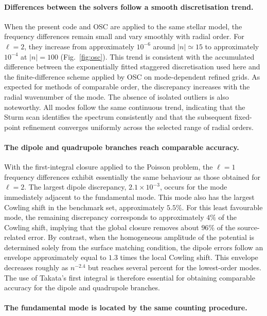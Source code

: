 \documentclass[]{aa}
\begin{document}
\paragraph{Differences between the solvers follow a smooth discretisation
trend.}When the present code and OSC are applied to the same stellar model, the
frequency differences remain small and vary smoothly with radial order. For
$\ell=2$, they increase from approximately $10^{-6}$ around
$|n|\simeq15$ to approximately $10^{-4}$ at $|n|=100$
(Fig.~\ref{fig:osc}). This trend is consistent with the accumulated
difference between the exponentially fitted staggered discretisation used
here and the finite-difference scheme applied by OSC on mode-dependent
refined grids. As expected for methods of comparable order, the discrepancy
increases with the radial wavenumber of the mode. The absence of isolated outliers is also noteworthy. All modes follow the
same continuous trend, indicating that the Sturm scan identifies the
spectrum consistently and that the subsequent fixed-point refinement
converges uniformly across the selected range of radial orders.

\paragraph{The dipole and quadrupole branches reach comparable accuracy.}

With the first-integral closure applied to the Poisson problem, the
$\ell=1$ frequency differences exhibit essentially the same behaviour as
those obtained for $\ell=2$. The largest dipole discrepancy,
$2.1\times10^{-3}$, occurs for the mode immediately adjacent to the
fundamental mode. This mode also has the largest Cowling shift in the
benchmark set, approximately $5.5\%$. For this least favourable mode, the remaining discrepancy corresponds to
approximately $4\%$ of the Cowling shift, implying that the global closure
removes about $96\%$ of the source-related error. By contrast, when the
homogeneous amplitude of the potential is determined solely from the surface
matching condition, the dipole errors follow an envelope approximately equal
to $1.3$ times the local Cowling shift. This envelope decreases roughly as
$n^{-2.4}$ but reaches several percent for the lowest-order modes. The use
of Takata's first integral is therefore essential for obtaining comparable
accuracy for the dipole and quadrupole branches.

\paragraph{The fundamental mode is located by the same counting procedure.}
\end{document}
